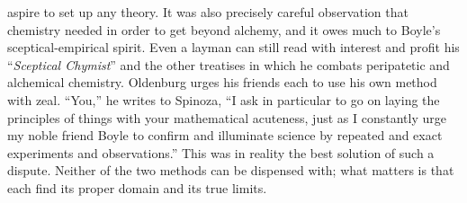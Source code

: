\documentclass[12pt]{book}
\begin{document}
aspire to set up any theory. It was also precisely careful observation that chemistry
needed in order to get beyond alchemy, and it owes much to Boyle's sceptical-empirical
spirit. Even a layman can still read with interest and profit his ``\textit{Sceptical
Chymist}'' and the other treatises in which he combats peripatetic and alchemical
chemistry. Oldenburg urges his friends each to use his own method with zeal. ``You,''
he writes to Spinoza, ``I ask in particular to go on laying the principles of things
with your mathematical acuteness, just as I constantly urge my noble friend Boyle to
confirm and illuminate science by repeated and exact experiments and observations.''
This was in reality the best solution of such a dispute. Neither of the two methods
can be dispensed with; what matters is that each find its proper domain and its true
limits.
\end{document}
